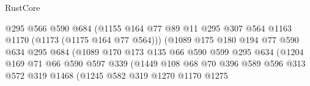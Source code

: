 \begin{lexlean}{RustCore}
\begin{coremodule}
                                    @295
                                    @566
                                    @590
                                    @684
                                    (@1155
                                      @164
                                      @77
                                      @89
                                      @11
                                      @295
                                      @307
                                      @564
                                      @1163
                                      @1170
                                      (@1173 (@1175 @164 @77 @564)))
                                    (@1089
                                      @175
                                      @180
                                      @194
                                      @77
                                      @590
                                      @634
                                      @295
                                      @684
                                      (@1089
                                        @170
                                        @173
                                        @135
                                        @66
                                        @590
                                        @599
                                        @295
                                        @634
                                        (@1204
                                          @169
                                          @71
                                          @66
                                          @590
                                          @597
                                          @339
                                          (@1449
                                            @108
                                            @68
                                            @70
                                            @396
                                            @589
                                            @596
                                            @313
                                            @572
                                            @319
                                            @1468
                                            (@1245
                                              @582
                                              @319
                                              @1270
                                              @1170
                                              @1275

\end{coremodule}
\end{lexlean}
